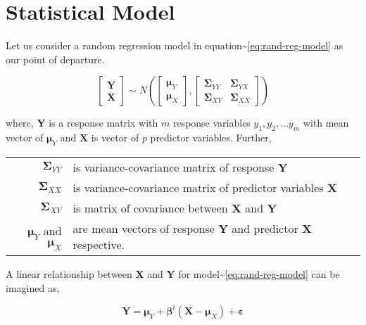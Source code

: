 \documentclass[12pt,A4paper,authoryear]{elsarticle} %
\begin{document}
\section{Statistical Model}\label{statistical-model}

Let us consider a random regression model in
equation\textasciitilde{}\eqref{eq:rand-reg-model} as our point of
departure.

\begin{equation}
  \begin{bmatrix}\mathbf{Y}\\ \mathbf{X}\end{bmatrix} \sim N
  \left(
    \begin{bmatrix}
      \boldsymbol{\mu}_Y \\
      \boldsymbol{\mu}_X
    \end{bmatrix},
    \begin{bmatrix}
      \boldsymbol{\Sigma}_{YY} & \boldsymbol{\Sigma}_{YX} \\
      \boldsymbol{\Sigma}_{XY} & \boldsymbol{\Sigma}_{XX}
    \end{bmatrix}
  \right)
  \label{eq:rand-reg-model}
\end{equation}

where, \(\mathbf{Y}\) is a response matrix with \(m\) response variables
\(y_1, y_2, \ldots y_m\) with mean vector of \(\boldsymbol{\mu}_Y\) and
\(\mathbf{X}\) is vector of \(p\) predictor variables. Further,

\begin{longtable}[]{@{}rl@{}}
\toprule
\(\boldsymbol{\Sigma}_{YY}\) & is variance-covariance matrix of response
\(\mathbf{Y}\)\tabularnewline
\(\boldsymbol{\Sigma}_{XX}\) & is variance-covariance matrix of
predictor variables \(\mathbf{X}\)\tabularnewline
\(\boldsymbol{\Sigma}_{XY}\) & is matrix of covariance between
\(\mathbf{X}\) and \(\mathbf{Y}\)\tabularnewline
\(\boldsymbol{\mu}_Y\) and \(\boldsymbol{\mu}_X\) & are mean vectors of
response \(\mathbf{Y}\) and predictor \(\mathbf{X}\)
respective.\tabularnewline
\bottomrule
\end{longtable}

A linear relationship between \(\mathbf{X}\) and \(\mathbf{Y}\) for
model\textasciitilde{}\eqref{eq:rand-reg-model} can be imagined as,

\begin{equation}
\mathbf{Y} = \boldsymbol{\mu}_Y + \boldsymbol{\beta}^t (\mathbf{X} - \boldsymbol{\mu}_X) + \boldsymbol{\varepsilon}
  \label{eq:linear-model}
\end{equation}
\end{document}
